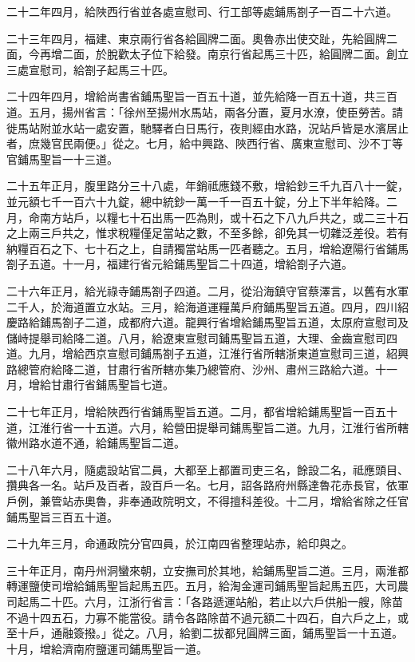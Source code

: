 \begin{pinyinscope}
 二十二年四月，給陜西行省並各處宣慰司、行工部等處鋪馬劄子一百二十六道。



 二十三年四月，福建、東京兩行省各給圓牌二面。奧魯赤出使交趾，先給圓牌二面，今再增二面，於脫歡太子位下給發。南京行省起馬三十匹，給圓牌二面。創立三處宣慰司，給劄子起馬三十匹。



 二十四年四月，增給尚書省鋪馬聖旨一百五十道，並先給降一百五十道，共三百道。五月，揚州省言：「徐州至揚州水馬站，兩各分置，夏月水潦，使臣勞苦。請徙馬站附並水站一處安置，馳驛者白日馬行，夜則經由水路，況站戶皆是水濱居止者，庶幾官民兩便。」從之。七月，給中興路、陜西行省、廣東宣慰司、沙不丁等官鋪馬聖旨一十三道。



 二十五年正月，腹里路分三十八處，年銷祗應錢不敷，增給鈔三千九百八十一錠，並元額七千一百六十九錠，總中統鈔一萬一千一百五十錠，分上下半年給降。二月，命南方站戶，以糧七十石出馬一匹為則，或十石之下八九戶共之，或二三十石之上兩三戶共之，惟求稅糧僅足當站之數，不至多餘，卻免其一切雜泛差役。若有納糧百石之下、七十石之上，自請獨當站馬一匹者聽之。五月，增給遼陽行省鋪馬劄子五道。十一月，福建行省元給鋪馬聖旨二十四道，增給劄子六道。



 二十六年正月，給光祿寺鋪馬劄子四道。二月，從沿海鎮守官蔡澤言，以舊有水軍二千人，於海道置立水站。三月，給海道運糧萬戶府鋪馬聖旨五道。四月，四川紹慶路給鋪馬劄子二道，成都府六道。龍興行省增給鋪馬聖旨五道，太原府宣慰司及儲峙提舉司給降二道。八月，給遼東宣慰司鋪馬聖旨五道，大理、金齒宣慰司四道。九月，增給西京宣慰司鋪馬劄子五道，江淮行省所轄浙東道宣慰司三道，紹興路總管府給降二道，甘肅行省所轄亦集乃總管府、沙州、肅州三路給六道。十一月，增給甘肅行省鋪馬聖旨七道。



 二十七年正月，增給陜西行省鋪馬聖旨五道。二月，都省增給鋪馬聖旨一百五十道，江淮行省一十五道。六月，給營田提舉司鋪馬聖旨二道。九月，江淮行省所轄徽州路水道不通，給鋪馬聖旨二道。



 二十八年六月，隨處設站官二員，大都至上都置司吏三名，餘設二名，祗應頭目、攢典各一名。站戶及百者，設百戶一名。七月，詔各路府州縣達魯花赤長官，依軍戶例，兼管站赤奧魯，非奉通政院明文，不得擅科差役。十二月，增給省除之任官鋪馬聖旨三百五十道。



 二十九年三月，命通政院分官四員，於江南四省整理站赤，給印與之。



 三十年正月，南丹州洞蠻來朝，立安撫司於其地，給鋪馬聖旨二道。三月，兩淮都轉運鹽使司增給鋪馬聖旨起馬五匹。五月，給淘金運司鋪馬聖旨起馬五匹，大司農司起馬二十匹。六月，江浙行省言：「各路遞運站船，若止以六戶供船一艘，除苗不過十四五石，力寡不能當役。請令各路除苗不過元額二十四石，自六戶之上，或至十戶，通融簽撥。」從之。八月，給劉二拔都兒圓牌三面，鋪馬聖旨一十五道。十月，增給濟南府鹽運司鋪馬聖旨一道。




\end{pinyinscope}
